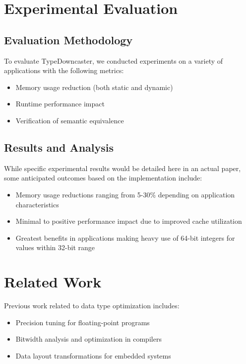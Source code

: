 \documentclass[conference]{IEEEtran}
\begin{document}
\section{Experimental Evaluation}
\subsection{Evaluation Methodology}
To evaluate TypeDowncaster, we conducted experiments on a variety of applications with the following metrics:
\begin{itemize}
    \item Memory usage reduction (both static and dynamic)
    \item Runtime performance impact
    \item Verification of semantic equivalence
\end{itemize}

\subsection{Results and Analysis}
While specific experimental results would be detailed here in an actual paper, some anticipated outcomes based on the implementation include:

\begin{itemize}
    \item Memory usage reductions ranging from 5-30\% depending on application characteristics
    \item Minimal to positive performance impact due to improved cache utilization
    \item Greatest benefits in applications making heavy use of 64-bit integers for values within 32-bit range
\end{itemize}

\section{Related Work}
Previous work related to data type optimization includes:

\begin{itemize}
    \item Precision tuning for floating-point programs \cite{fptuning}
    \item Bitwidth analysis and optimization in compilers \cite{bitwidth}
    \item Data layout transformations for embedded systems \cite{embedded}
\end{itemize}
\end{document}
